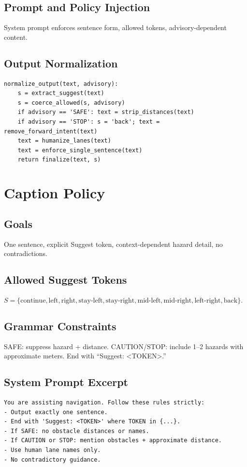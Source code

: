 \documentclass[11pt,a4paper]{article}
\begin{document}
\subsection{Prompt and Policy Injection}
System prompt enforces sentence form, allowed tokens, advisory-dependent content.

\subsection{Output Normalization}
\begin{lstlisting}[style=code]
normalize_output(text, advisory):
    s = extract_suggest(text)
    s = coerce_allowed(s, advisory)
    if advisory == 'SAFE': text = strip_distances(text)
    if advisory == 'STOP': s = 'back'; text = remove_forward_intent(text)
    text = humanize_lanes(text)
    text = enforce_single_sentence(text)
    return finalize(text, s)
\end{lstlisting}

\section{Caption Policy}
\subsection{Goals}
One sentence, explicit Suggest token, context-dependent hazard detail, no contradictions.

\subsection{Allowed Suggest Tokens}
$S=\{\text{continue},\text{left},\text{right},\text{stay-left},\text{stay-right},\text{mid-left},\text{mid-right},\text{left-right},\text{back}\}$.

\subsection{Grammar Constraints}
SAFE: suppress hazard + distance. CAUTION/STOP: include 1--2 hazards with approximate meters. End with ``Suggest: <TOKEN>.''

\subsection{System Prompt Excerpt}
\begin{lstlisting}[style=code]
You are assisting navigation. Follow these rules strictly:
- Output exactly one sentence.
- End with 'Suggest: <TOKEN>' where TOKEN in {...}.
- If SAFE: no obstacle distances or names.
- If CAUTION or STOP: mention obstacles + approximate distance.
- Use human lane names only.
- No contradictory guidance.
\end{lstlisting}
\end{document}
